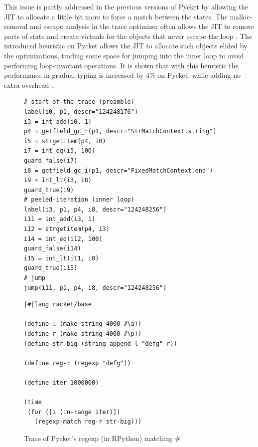 This issue is partly addressed in the previous versions of Pycket by
allowing the JIT to allocate a little bit more to force a match
between the states. The malloc-removal and escape analysis in the
trace optimizer often allows the JIT to remove parts of state and
create virtuals for the objects that never escape the loop
\cite{malloc-removal:11, loop-aware:12}. The introduced heuristic on
Pycket allows the JIT to allocate such objects elided by the
optimizations, trading some space for jumping into the inner loop to
avoid performing loop-invariant operations. It is shown that with this
heuristic the performance in gradual typing is increased by 4\% on
Pycket, while adding no extra overhead \cite{pycket17}.

\begin{figure}
    \centering
    \begin{minipage}[t]{0.38\textwidth}
      \begin{verbatim}
# start of the trace (preamble)
label(i0, p1, descr="124248176")
i3 = int_add(i0, 1)
p4 = getfield_gc_r(p1, descr="StrMatchContext.string")
i5 = strgetitem(p4, i0)
i7 = int_eq(i5, 100)
guard_false(i7)
i8 = getfield_gc_i(p1, descr="FixedMatchContext.end")
i9 = int_lt(i3, i8)
guard_true(i9)
# peeled-iteration (inner loop)
label(i3, p1, p4, i8, descr="124248256")
i11 = int_add(i3, 1)
i12 = strgetitem(p4, i3)
i14 = int_eq(i12, 100)
guard_false(i14)
i15 = int_lt(i11, i8)
guard_true(i15)
# jump
jump(i11, p1, p4, i8, descr="124248256")
    \end{verbatim}
    \end{minipage}
    \begin{minipage}[t]{0.38\textwidth}
      \begin{verbatim}
|#|lang racket/base

(define l (make-string 4000 #\a))
(define r (make-string 4000 #\p))
(define str-big (string-append l "defg" r))

(define reg-r (regexp "defg"))

(define iter 1000000)

(time
 (for ([i (in-range iter)])
   (regexp-match reg-r str-big)))
    \end{verbatim}
    \end{minipage}
    \caption{\small Trace of Pycket's regexp (in RPython) matching
      $\mathtt{\#}$}
    \label{fig:regexp-trace}
  \end{figure}

